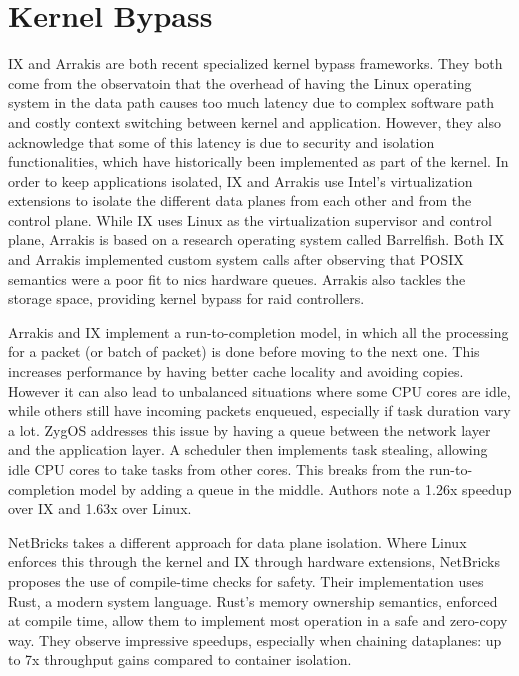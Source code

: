 \section{Kernel Bypass}

IX\cite{ix} and Arrakis\cite{arrakis} are both recent specialized kernel bypass frameworks.
They both come from the observatoin that the overhead of having the Linux operating system in the data path causes too much latency due to complex software path and costly context switching between kernel and application.
However, they also acknowledge that some of this latency is due to security and isolation functionalities, which have historically been implemented as part of the kernel.
In order to keep applications isolated, IX and Arrakis use Intel's virtualization extensions to isolate the different data planes from each other and from the control plane.
While IX uses Linux as the virtualization supervisor and control plane, Arrakis is based on a research operating system called Barrelfish.
Both IX and Arrakis implemented custom system calls after observing that POSIX semantics were a poor fit to \glspl{nic} hardware queues.
Arrakis also tackles the storage space, providing kernel bypass for \gls{raid} controllers.

Arrakis and IX implement a run-to-completion model, in which all the processing for a packet (or batch of packet) is done before moving to the next one.
This increases performance by having better cache locality and avoiding copies.
However it can also lead to unbalanced situations where some CPU cores are idle, while others still have incoming packets enqueued, especially if task duration vary a lot.
ZygOS\cite{zygos} addresses this issue by having a queue between the network layer and the application layer.
A scheduler then implements task stealing, allowing idle CPU cores to take tasks from other cores.
This breaks from the run-to-completion model by adding a queue in the middle.
Authors note a 1.26x speedup over IX and 1.63x over Linux.

NetBricks\cite{netbricks} takes a different approach for data plane isolation.
Where Linux enforces this through the kernel and IX through hardware extensions, NetBricks proposes the use of compile-time checks for safety.
Their implementation uses Rust, a modern system language.
Rust's memory ownership semantics, enforced at compile time, allow them to implement most operation in a safe and zero-copy way.
They observe impressive speedups, especially when chaining dataplanes: up to 7x throughput gains compared to container isolation.

